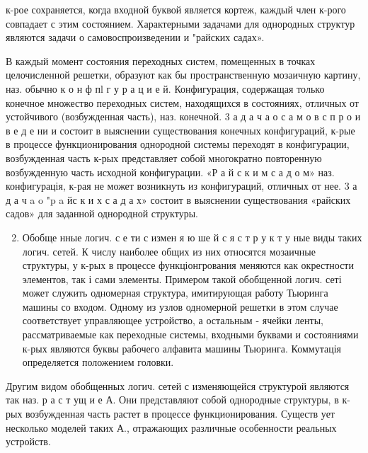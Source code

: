 \documentclass[10pt]{article}
\begin{document}
к-рое сохраняется, когда входной буквой является кортеж, каждый член к-рого совпадает с этим состоянием. Характерными задачами для однородных структур являются задачи о самовоспроизведении и "райских садах».



В каждый момент состояния переходных систем, помещенных в точках целочисленной решетки, образуют как бы пространственную мозаичную картину, наз. обычно к о н ф пl г у р а ц и е й. Конфигурация, содержащая только конечное множество переходных систем, находящихся в состояниях, отличных от устойчивого (возбужденная часть), наз. конечной. 3 а д а ч а о с а м о в с п р о и в е д е ни и состоит в выяснении существования конечных конфигураций, к-рые в процессе функционирования однородной системы переходят в конфигурации, возбужденная часть к-рых представляет собой многократно повторенную возбужденную часть исходной конфигурации. «Р а й с к и м с а д о м» наз. конфигурація, к-рая не может возникнуть из конфигураций, отличных от нее. 3 а д а ч a o "p a йс к и х с а д а х» состоит в выяснении существования «райских садов» для заданной однородной структуры.



\begin{enumerate}

  \setcounter{enumi}{1}

  \item Обобще нные логич. с е ти с измен я ю ше й с я с т р у к т у ные виды таких логич. сетей. $К$ числу наиболее общих из них относятся мозаичные структуры, у к-рых в процессе функціонгрования меняются как окрестности элементов, так і сами элементы. Примером такой обобщенной логич. сеті может служить одномерная структура, имитирующая работу Тьюринга машины со входом. Одному из узлов одномерной решетки в этом случае соответствует управляющее устройство, а остальным - ячейки ленты, рассматриваемые как переходные системы, входными буквами и состояниями к-рых являются буквы рабочего алфавита машины Тьюринга. Коммутація определяется положением головки.

\end{enumerate}



Другим видом обобщенных логич. сетей с изменяющейся структурой являются так наз. р а с т ущ и е А. Они представляют собой однородные структуры, в к-рых возбужденная часть растет в процессе функционирования. Существ ует несколько моделей таких А., отражающих различные особенности реальных устройств.
\end{document}

